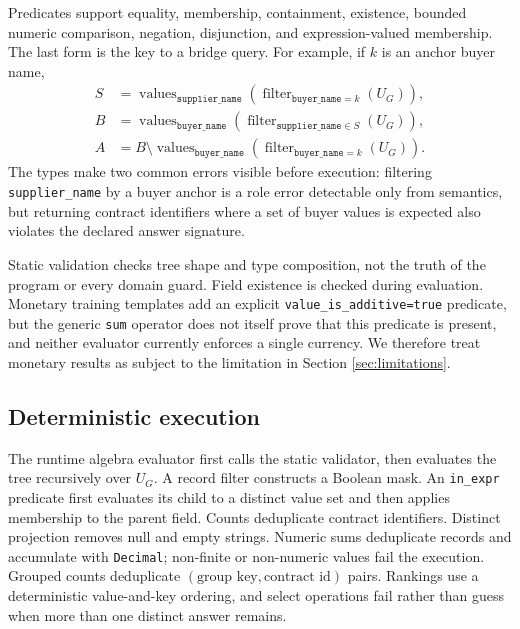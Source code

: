 Predicates support equality, membership, containment, existence, bounded numeric comparison,
negation, disjunction, and expression-valued membership.  The last form is the key to a bridge
query.  For example, if $k$ is an anchor buyer name,
\begin{align}
 S &= \operatorname{values}_{\texttt{supplier\_name}}
      (\operatorname{filter}_{\texttt{buyer\_name}=k}(U_G)),\\
 B &= \operatorname{values}_{\texttt{buyer\_name}}
      (\operatorname{filter}_{\texttt{supplier\_name}\in S}(U_G)),\\
 A &= B\setminus
      \operatorname{values}_{\texttt{buyer\_name}}
      (\operatorname{filter}_{\texttt{buyer\_name}=k}(U_G)).
 \label{eq:bridge-example}
\end{align}
The types make two common errors visible before execution: filtering
\texttt{supplier\_name} by a buyer anchor is a role error detectable only from semantics, but
returning contract identifiers where a set of buyer values is expected also violates the
declared answer signature.

Static validation checks tree shape and type composition, not the truth of the program or every
domain guard.  Field existence is checked during evaluation.  Monetary training templates add
an explicit \texttt{value\_is\_additive=true} predicate, but the generic \texttt{sum} operator
does not itself prove that this predicate is present, and neither evaluator currently enforces a
single currency.  We therefore treat monetary results as subject to the limitation in Section
\ref{sec:limitations}.

\subsection{Deterministic execution}
\label{sec:execution}

The runtime algebra evaluator first calls the static validator, then evaluates the tree
recursively over $U_G$.  A record filter constructs a Boolean mask.  An
\texttt{in\_expr} predicate first evaluates its child to a distinct value set and then applies
membership to the parent field.  Counts deduplicate contract identifiers.  Distinct projection
removes null and empty strings.  Numeric sums deduplicate records and accumulate with
\texttt{Decimal}; non-finite or non-numeric values fail the execution.  Grouped counts
deduplicate $(\text{group key},\text{contract id})$ pairs.  Rankings use a deterministic
value-and-key ordering, and select operations fail rather than guess when more than one distinct
answer remains.

